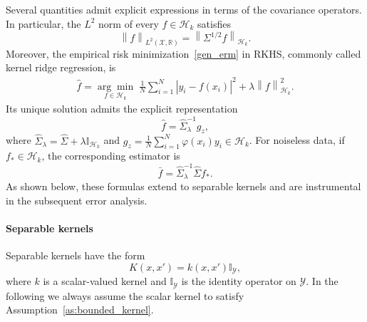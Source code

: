 \documentclass[11pt]{article}
\numberwithin{equation}{section}
\theoremstyle{plain}
\theoremstyle{definition}
\theoremstyle{remark}
\newcommand{\X}{\mathcal{X}}
\newcommand{\Hs}{\mathcal{H}}
\newcommand{\Y}{\mathcal{Y}}
\newcommand{\I}{\mathbb{I}}
\newcommand{\Real}{\mathbb{R}}
\newcommand{\norm}[1]{\left\lVert#1\right\rVert}
\newcommand{\abs}[1]{\left|#1\right|}
\begin{document}
Several quantities admit explicit expressions in terms of the covariance
operators. In particular, the $L^2$ norm of every $f\in\Hs_k$ satisfies
\begin{equation}\label{scal_norm_eq}
\norm{f}_{L^2(\X,\Real)}
=
\norm{\Sigma^{1/2}f}_{\Hs_k}.
\end{equation}
Moreover, the empirical risk minimization~\eqref{gen_erm} in RKHS, commonly
called kernel ridge regression, is
\begin{align}\label{scal_krr}
\hat{f}
=
\underset{f\in\Hs_k}{\arg\min}\;
\frac{1}{N}\sum_{i=1}^N
\abs{y_i-f(x_i)}^2
+\lambda\norm{f}_{\Hs_k}^2.
\end{align}
Its unique solution admits the explicit representation
\begin{equation}\label{eq:representer_noise}
\hat{f}= \hat{\Sigma}_{\lambda}^{-1}g_z,
\end{equation}
where $\hat{\Sigma}_{\lambda}=\hat{\Sigma}+\lambda\I_{\Hs_k}$ and
$g_z=\frac{1}{N}\sum_{i=1}^N\varphi(x_i)y_i\in\Hs_k$.
For noiseless data, if $f_*\in\Hs_k$, the corresponding estimator is
\begin{equation}\label{eq:representer_noiseless}
\bar{f}
=
\hat{\Sigma}_{\lambda}^{-1}\hat{\Sigma}f_*.
\end{equation}
As shown below, these formulas extend to separable kernels and are
instrumental in the subsequent error analysis.

\paragraph{Separable kernels}

Separable kernels \cite{alvarez2012kernels} have the form
\begin{equation}\label{sep_ker}
K(x,x')=k(x,x')\I_{\Y},
\end{equation}
where $k$ is a scalar-valued kernel and $\I_{\Y}$ is the identity operator on
$\Y$. In the following we always assume the scalar kernel to satisfy Assumption~\ref{as:bounded_kernel}.
\end{document}
